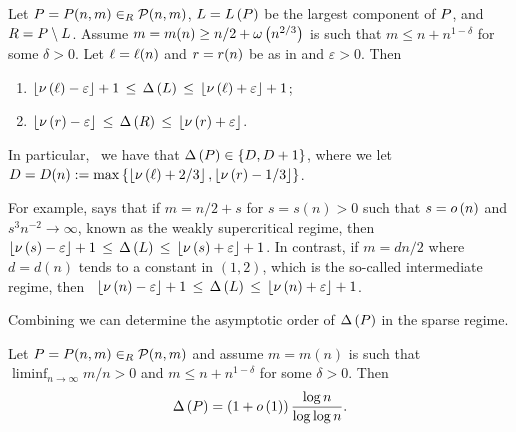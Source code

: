 \begin{thm}\label{MDthm:main}
Let $P=P(n,m)\in_R \mathcal{P}(n,m)$, $L=L\left(P\right)$ be the largest component of $P$, and $R=P\setminus L$. Assume $m=m(n)\geq n/2+\omega\left(n^{2/3}\right)$ is such that $m\leq n+n^{1-\delta}$ for some $\delta>0$. Let $\ell=\ell(n)$ and $r=r(n)$ be as in  and $\varepsilon>0$. Then \whp
\begin{enumerate}
	\item\label{MDthm:main1} $\left\lfloor\nu\left(\ell\right)-\varepsilon\right\rfloor+1\hspace{0.06cm}\leq\hspace{0.06cm} \Delta\left(L\right)\hspace{0.06cm}\leq\hspace{0.06cm} \left\lfloor\nu\left(\ell\right)+\varepsilon\right\rfloor+1$;
	\item\label{MDthm:main2} $\left\lfloor\nu\left(r\right)-\varepsilon\right\rfloor\hspace{0.06cm}\leq\hspace{0.06cm} \Delta\left(R\right)\hspace{0.06cm}\leq\hspace{0.06cm} \left\lfloor\nu\left(r\right)+\varepsilon\right\rfloor$.
\end{enumerate}
In particular, \whp\ we have that $\Delta\left(P\right)\in \left\{D, D+1\right\}$, where we let $D=D(n):=\max\left\{\left\lfloor\nu\left(\ell\right)+2/3\right\rfloor, \left\lfloor\nu\left(r\right)-1/3\right\rfloor\right\}$.
\end{thm}

For example,  says that if $m=n/2+s$ for $s=s(n)>0$ such that $s=o\left(n\right)$ and $s^3n^{-2}\to \infty$, known as the weakly supercritical regime, then \whp\ $\left\lfloor\nu\left(s\right)-\varepsilon\right\rfloor+1\hspace{0.06cm}\leq\hspace{0.06cm} \Delta\left(L\right)\hspace{0.06cm}\leq\hspace{0.06cm} \left\lfloor\nu\left(s\right)+\varepsilon\right\rfloor+1$. In contrast, if $m=d n/2$ where $d=d(n)$ tends to a constant in $\left(1,2\right)$, which is the so-called intermediate regime, then \whp\ $\left\lfloor\nu\left(n\right)-\varepsilon\right\rfloor+1\hspace{0.06cm}\leq\hspace{0.06cm} \Delta\left(L\right)\hspace{0.06cm}\leq\hspace{0.06cm} \left\lfloor\nu\left(n\right)+\varepsilon\right\rfloor+1$.

Combining  we can determine the asymptotic order of $\Delta\left(P\right)$ in the sparse regime.
\begin{coro}\label{MDcor:maxdegree}
	Let $P=P(n,m)\in_R \mathcal{P}(n,m)$ and assume $m=m(n)$ is such that $\liminf_{n \to \infty} m/n>0$ and $m\leq n+n^{1-\delta}$ for some $\delta>0$. Then \whp
	\begin{align*}
	\Delta\left(P\right)=\left(1+o\left(1\right)\right)\frac{\log n}{\log \log n}.
	\end{align*}
\end{coro}

